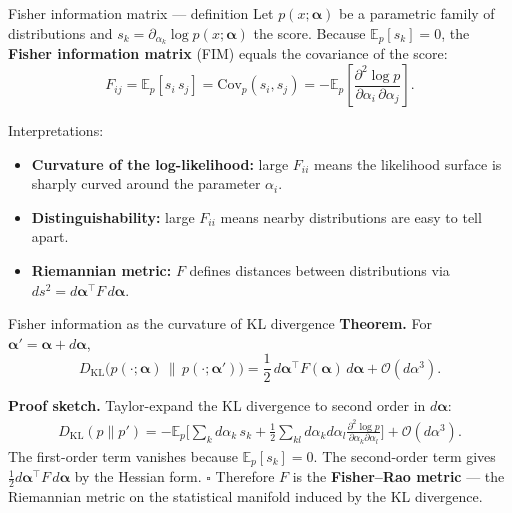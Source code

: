 \documentclass[aspectratio=169]{beamer}
\newcommand{\dkl}{D_{\mathrm{KL}}}
\begin{document}

\begin{frame}{Fisher information matrix — definition}
Let \(p(x;\bm{\alpha})\) be a parametric family of distributions
and \(s_k=\partial_{\alpha_k}\log p(x;\bm{\alpha})\) the score.
Because \(\mathbb{E}_p[s_k]=0\), the \textbf{Fisher information
matrix} (FIM) equals the covariance of the score:
\[
\boxed{
F_{ij}
=\mathbb{E}_p[s_i\,s_j]
=\mathrm{Cov}_p(s_i,s_j)
=-\mathbb{E}_p\!\left[
  \frac{\partial^2\log p}{\partial\alpha_i\,\partial\alpha_j}
\right].}
\]

\medskip

Interpretations:
\begin{itemize}
  \item \textbf{Curvature of the log-likelihood:} large \(F_{ii}\)
        means the likelihood surface is sharply curved around
        the parameter \(\alpha_i\).
  \item \textbf{Distinguishability:} large \(F_{ii}\) means nearby
        distributions are easy to tell apart.
  \item \textbf{Riemannian metric:} \(F\) defines distances between
        distributions via \(ds^2=d\bm{\alpha}^\top F\,d\bm{\alpha}\).
\end{itemize}
\end{frame}

\begin{frame}{Fisher information as the curvature of KL divergence}
\textbf{Theorem.}  For \(\bm{\alpha}'=\bm{\alpha}+d\bm{\alpha}\),
\[
\dkl\!\bigl(p(\cdot;\bm{\alpha})\,\|\,p(\cdot;\bm{\alpha}')\bigr)
=\frac{1}{2}\,d\bm{\alpha}^\top F(\bm{\alpha})\,d\bm{\alpha}
+\mathcal{O}(d\alpha^3).
\]

\textbf{Proof sketch.}  Taylor-expand the KL divergence to
second order in \(d\bm{\alpha}\):
\begin{multline*}
\dkl(p\|p')
=-\mathbb{E}_p\!\biggl[\sum_k d\alpha_k\,s_k
+\tfrac{1}{2}\sum_{kl}d\alpha_k d\alpha_l
\frac{\partial^2\log p}{\partial\alpha_k\partial\alpha_l}
\biggr]+\mathcal{O}(d\alpha^3).
\end{multline*}
The first-order term vanishes because \(\mathbb{E}_p[s_k]=0\).
The second-order term gives \(\tfrac{1}{2}d\bm{\alpha}^\top F\,d\bm{\alpha}\)
by the Hessian form. \(\square\)
Therefore \(F\) is the \textbf{Fisher--Rao metric} — the Riemannian
metric on the statistical manifold induced by the KL divergence.
\end{frame}
\end{document}
